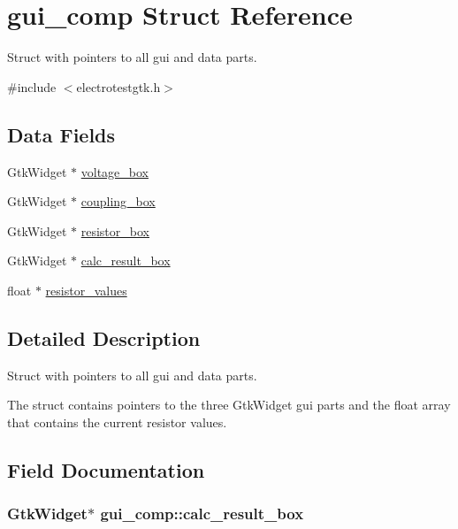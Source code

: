 \hypertarget{structgui__comp}{}\section{gui\+\_\+comp Struct Reference}
\label{structgui__comp}


Struct with pointers to all gui and data parts.  




{\ttfamily \#include $<$electrotestgtk.\+h$>$}

\subsection*{Data Fields}
\begin{DoxyCompactItemize}
\item 
Gtk\+Widget $\ast$ \hyperlink{structgui__comp_a3fd9c0f2b750bac7e5bb0ad46d0d2f68}{voltage\+\_\+box}
\item 
Gtk\+Widget $\ast$ \hyperlink{structgui__comp_a7722645fb23d70f748dce48726312e48}{coupling\+\_\+box}
\item 
Gtk\+Widget $\ast$ \hyperlink{structgui__comp_ac199204a02b549dbfaa6e3fbc83afde3}{resistor\+\_\+box}
\item 
Gtk\+Widget $\ast$ \hyperlink{structgui__comp_a3cb01fb696899c3e338e42a9a53c1060}{calc\+\_\+result\+\_\+box}
\item 
float $\ast$ \hyperlink{structgui__comp_af1b4ad2cb926ff413cb2ae610f8c434d}{resistor\+\_\+values}
\end{DoxyCompactItemize}


\subsection{Detailed Description}
Struct with pointers to all gui and data parts. 

The struct contains pointers to the three Gtk\+Widget gui parts and the float array that contains the current resistor values. 

\subsection{Field Documentation}
\subsubsection[{\texorpdfstring{calc\+\_\+result\+\_\+box}{calc_result_box}}]{\setlength{\rightskip}{0pt plus 5cm}Gtk\+Widget$\ast$ gui\+\_\+comp\+::calc\+\_\+result\+\_\+box}\hypertarget{structgui__comp_a3cb01fb696899c3e338e42a9a53c1060}{}\label{structgui__comp_a3cb01fb696899c3e338e42a9a53c1060}
